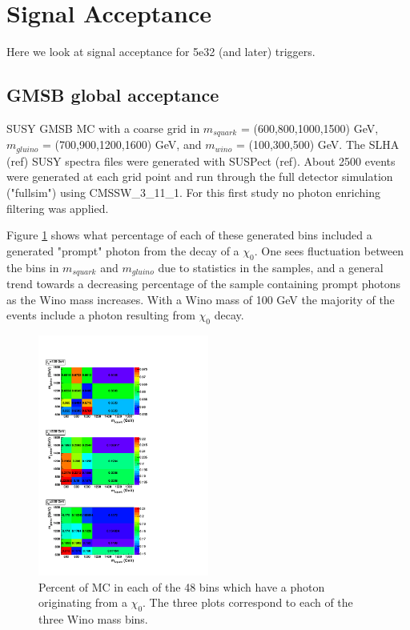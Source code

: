\section{Signal Acceptance}
\label{sec:signalMC}

Here we look at signal acceptance for 5e32 (and later) triggers.

\subsection{GMSB global acceptance}

SUSY GMSB MC with a coarse grid in $m_{squark}$ = (600,800,1000,1500) GeV, $m_{gluino}$ = (700,900,1200,1600) GeV,
and $m_{wino}$ = (100,300,500) GeV.  The SLHA (ref) SUSY spectra files were generated with SUSPect (ref).
About 2500 events were generated at each grid point and run through the full detector simulation ("fullsim") 
using CMSSW\_3\_11\_1.  For this first study no photon enriching filtering was applied.

Figure \ref{fig:genphotons} shows what percentage of each of these 
generated bins included a generated "prompt" photon from the decay of a $\chi_0$.  One sees fluctuation
between the bins in $m_{squark}$ and $m_{gluino}$ due to statistics in the samples, and a general
trend towards a decreasing percentage of the sample containing prompt photons as the Wino mass increases.
With a Wino mass of 100 GeV the majority of the events include a photon resulting from $\chi_0$ decay.

 \begin{figure}[!ht]
  \centering
 \includegraphics[width=0.5\textwidth]{figures/genphotonsnopu.pdf}
\caption{Percent of MC in each of the 48 bins which have a photon originating from a $\chi_0$.  The three
plots correspond to each of the three Wino mass bins.}
\label{fig:genphotons}
\end{figure}



